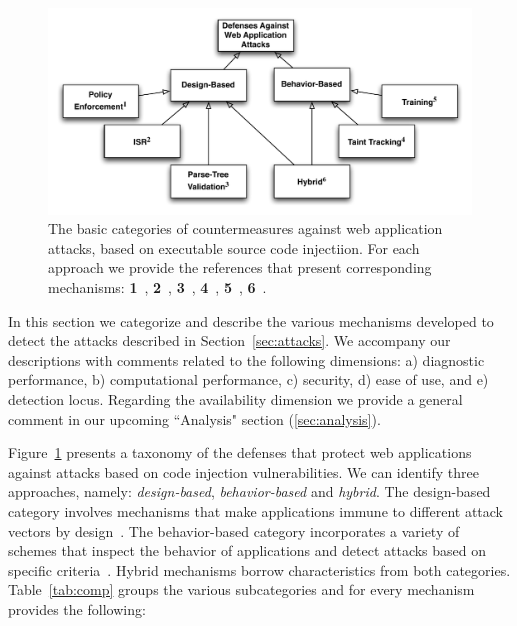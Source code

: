 \documentclass[conference]{IEEEtran}
\begin{document}
\begin{figure} [ht]
\begin{center}
\leavevmode
\includegraphics[scale=0.65]{defenses.pdf}
\end{center}
\caption{\label{fig:defenses}The basic categories of countermeasures
against web application attacks, based on executable source code
injectiion. For each approach we provide the references
that present corresponding mechanisms:
{\bf 1}~\cite{NSS06,JKK06a,KKVJ06,KJKV09,TNH07,RDWDE07,YCIS07,OWVS08,PSC09,ML10,DDHPJ10,PS11,VDDPJ11,BV08,LV09},
{\bf 2}~\cite{BK04,JB07,GC09,APKLM10},
{\bf 3}~\cite{BWS05,SW06},
{\bf 4}~\cite{HCF05,PB05,XBS06,NLC07,VFJKKV07,PMP11,SLMS14},
{\bf 5}~\cite{LLW02,HO05,HO06,HO05b,VMV05,JEP08,WPLKK09,MS09,MKS09,MKLS11},
{\bf 6}~\cite{BV08,LV09,SMS13}.}
\end{figure}

In this section we categorize and describe the various mechanisms
developed to detect the attacks described in
Section~\ref{sec:attacks}. We accompany our descriptions
with comments related to the following dimensions:
a) diagnostic performance, b) computational performance,
c) security, d) ease of use, and e) detection locus.
Regarding the availability dimension we provide a general
comment in our upcoming ``Analysis" section (\ref{sec:analysis}).

Figure~\ref{fig:defenses} presents a taxonomy of the
defenses that protect web applications against attacks based on
code injection vulnerabilities.
We can identify three approaches, namely:
{\it design-based}, {\it behavior-based} and {\it hybrid}.
The design-based category involves mechanisms that make applications
immune to different attack vectors by design~\cite{JL75,L81}. 
The behavior-based category incorporates a variety of
schemes that inspect the behavior of applications
and detect attacks based on specific criteria~\cite{D76,A00}.
Hybrid mechanisms borrow characteristics from both categories.
Table~\ref{tab:comp} groups the various subcategories
and for every mechanism provides the following:
\end{document}
